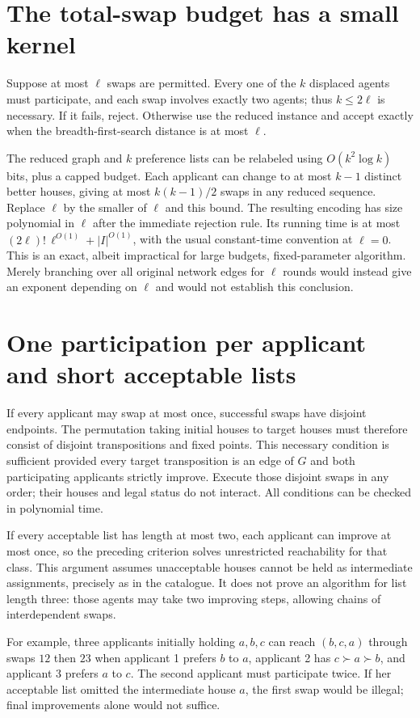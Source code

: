 \documentclass[11pt]{article}
\begin{document}
\section*{The total-swap budget has a small kernel}
Suppose at most $\ell$ swaps are permitted. Every one of the $k$ displaced agents must participate, and each swap involves exactly two agents; thus $k\leq2\ell$ is necessary. If it fails, reject. Otherwise use the reduced instance and accept exactly when the breadth-first-search distance is at most $\ell$.

The reduced graph and $k$ preference lists can be relabeled using $O(k^2\log k)$ bits, plus a capped budget. Each applicant can change to at most $k-1$ distinct better houses, giving at most $k(k-1)/2$ swaps in any reduced sequence. Replace $\ell$ by the smaller of $\ell$ and this bound. The resulting encoding has size polynomial in $\ell$ after the immediate rejection rule. Its running time is at most $(2\ell)!\,\ell^{O(1)}+|I|^{O(1)}$, with the usual constant-time convention at $\ell=0$. This is an exact, albeit impractical for large budgets, fixed-parameter algorithm. Merely branching over all original network edges for $\ell$ rounds would instead give an exponent depending on $\ell$ and would not establish this conclusion.

\section*{One participation per applicant and short acceptable lists}
If every applicant may swap at most once, successful swaps have disjoint endpoints. The permutation taking initial houses to target houses must therefore consist of disjoint transpositions and fixed points. This necessary condition is sufficient provided every target transposition is an edge of $G$ and both participating applicants strictly improve. Execute those disjoint swaps in any order; their houses and legal status do not interact. All conditions can be checked in polynomial time.

If every acceptable list has length at most two, each applicant can improve at most once, so the preceding criterion solves unrestricted reachability for that class. This argument assumes unacceptable houses cannot be held as intermediate assignments, precisely as in the catalogue. It does not prove an algorithm for list length three: those agents may take two improving steps, allowing chains of interdependent swaps.

For example, three applicants initially holding $a,b,c$ can reach $(b,c,a)$ through swaps $12$ then $23$ when applicant 1 prefers $b$ to $a$, applicant 2 has $c\succ a\succ b$, and applicant 3 prefers $a$ to $c$. The second applicant must participate twice. If her acceptable list omitted the intermediate house $a$, the first swap would be illegal; final improvements alone would not suffice.
\end{document}
